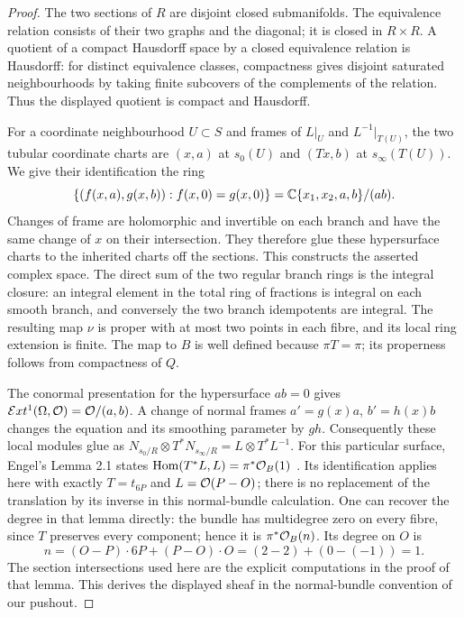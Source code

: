 \begin{proof}
The two sections of $R$ are disjoint closed submanifolds. The
equivalence relation consists of their two graphs and the diagonal;
it is closed in $R\times R$. A quotient of a compact Hausdorff space
by a closed equivalence relation is Hausdorff: for distinct equivalence
classes, compactness gives disjoint saturated neighbourhoods by taking
finite subcovers of the complements of the relation. Thus the displayed
quotient is compact and Hausdorff.

For a coordinate neighbourhood $U\subset S$ and frames of $L|_U$ and
$L^{-1}|_{T(U)}$, the two tubular coordinate charts are $(x,a)$ at
$s_0(U)$ and $(Tx,b)$ at $s_\infty(T(U))$. We give their identification
the ring
\[
 \{(f(x,a),g(x,b)):f(x,0)=g(x,0)\}
   =\mathbb C\{x_1,x_2,a,b\}/(ab).
\]
Changes of frame are holomorphic and invertible on each branch and
have the same change of $x$ on their intersection. They therefore glue
these hypersurface charts to the inherited charts off the sections.
This constructs the asserted complex space. The direct sum of the two
regular branch rings is the integral closure: an integral element in
the total ring of fractions is integral on each smooth branch, and
conversely the two branch idempotents are integral. The resulting map
$\nu$ is proper with at most two points in each fibre, and its local
ring extension is finite. The map to $B$ is well defined because
$\pi T=\pi$; its properness follows from compactness of $Q$.

The conormal presentation for the hypersurface $ab=0$ gives
$\mathcal Ext^1(\Omega,\mathcal O)=\mathcal O/(a,b)$. A change of normal frames
$a'=g(x)a$, $b'=h(x)b$ changes the equation and its smoothing parameter
by $gh$. Consequently these local modules glue as
$N_{s_0/R}\otimes T^*N_{s_\infty/R}=L\otimes T^*L^{-1}$.
For this particular surface, Engel's Lemma 2.1 states
$\operatorname{Hom}(T^*L,L)=\pi^*\mathcal O_B(1)$ \cite[Lemma 2.1]{E26}.
Its identification applies here with exactly $T=t_{6P}$ and $L=\mathcal O(P-O)$;
there is no replacement of the translation by its inverse in this
normal-bundle calculation. One can recover the degree in that lemma
directly: the bundle has multidegree zero on every fibre, since $T$
preserves every component; hence it is $\pi^*\mathcal O_B(n)$. Its degree on
$O$ is
\[
 n=(O-P)\cdot 6P+(P-O)\cdot O=(2-2)+(0-(-1))=1.
\]
The section intersections used here are the explicit computations in
the proof of that lemma. This derives the displayed sheaf in the
normal-bundle convention of our pushout.
\end{proof}

